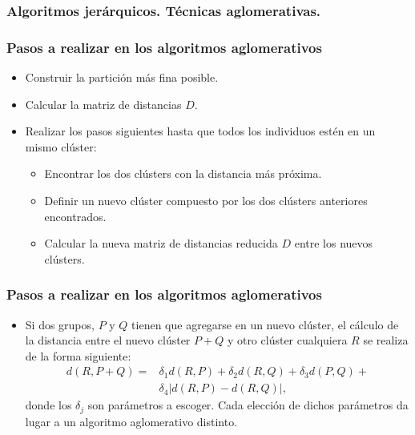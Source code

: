 \subsubsection{Algoritmos jerárquicos. Técnicas aglomerativas.}
\begin{frame}
\frametitle{Pasos a realizar en los algoritmos aglomerativos}
\begin{itemize}
\item<2->{Construir la partición más fina posible.}
\item<3->{Calcular la matriz de distancias $D$.}
\item<4->{Realizar los pasos siguientes hasta que todos los individuos estén en un mismo clúster:}
\begin{itemize}
\item<5->{Encontrar los dos clústers con la distancia más próxima.}
\item<6->{Definir un nuevo clúster compuesto por los dos clústers anteriores encontrados.}
\item<7->{Calcular la nueva matriz de distancias reducida $D$ entre los nuevos clústers.}
\end{itemize}
\end{itemize}
\end{frame}
\begin{frame}
\frametitle{Pasos a realizar en los algoritmos aglomerativos}
\begin{itemize}
\item<2->{Si dos grupos, $P$ y $Q$ tienen que agregarse en un nuevo clúster, el cálculo de la distancia entre el nuevo clúster $P+Q$ y otro clúster cualquiera $R$ se realiza de la forma siguiente:
$$
\begin{array}{rl}
d(R,P+Q)= & \delta_1 d(R,P)+\delta_2 d(R,Q)+\delta_3 d(P,Q)+ \\ & \delta_4 |d(R,P)-d(R,Q)|,
\end{array}
$$
donde los $\delta_j$ son parámetros a escoger. Cada elección de dichos parámetros da lugar a un algoritmo aglomerativo distinto.}
\end{itemize}
\end{frame}
